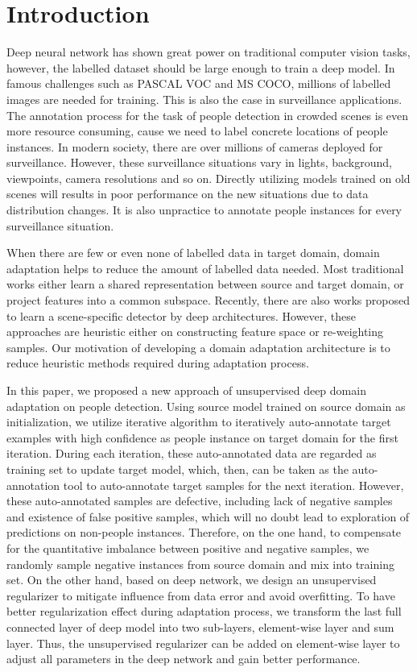 \documentclass[runningheads]{llncs}
\begin{document}
\section{Introduction}

Deep neural network has shown great power on traditional computer vision tasks, however, the labelled dataset should be large enough to train a deep model. In famous challenges such as PASCAL VOC and MS COCO, millions of labelled images are needed for training. This is also the case in surveillance applications. The annotation process for the task of people detection in crowded scenes is even more resource consuming, cause we need to label concrete locations of people instances. In modern society, there are over millions of cameras deployed for surveillance. However, these surveillance situations vary in lights, background, viewpoints, camera resolutions and so on. Directly utilizing models trained on old scenes will results in poor performance on the new situations due to data distribution changes. It is also unpractice to annotate people instances for every surveillance situation.

When there are few or even none of labelled data in target domain, domain adaptation helps to reduce the amount of labelled data needed. Most traditional works \cite{saenko2010adapting,kulis2011you,gopalan2011domain,huang2006correcting,gretton2009covariate} either learn a shared representation between source and target domain, or project features into a common subspace. Recently, there are also works \cite{wang2014scene,zeng2014deep,hattori2015learning} proposed to learn a scene-specific detector by deep architectures. However, these approaches are heuristic either on constructing feature space or re-weighting samples. Our motivation of developing a domain adaptation architecture is to reduce heuristic methods required during adaptation process.

In this paper, we proposed a new approach of unsupervised deep domain adaptation on people detection. Using source model trained on source domain as initialization, we utilize iterative algorithm to iteratively auto-annotate target examples with high confidence as people instance on target domain for the first iteration. During each iteration, these auto-annotated data are regarded as training set to update target model, which, then, can be taken as the auto-annotation tool to auto-annotate target samples for the next iteration. However, these auto-annotated samples are defective, including lack of negative samples and existence of false positive samples, which will no doubt lead to exploration of predictions on non-people instances. Therefore, on the one hand, to compensate for the quantitative imbalance between positive and negative samples, we randomly sample negative instances from source domain and mix into training set. On the other hand, based on deep network, we design an unsupervised regularizer to mitigate influence from data error and avoid overfitting. To have better regularization effect during adaptation process, we transform the last full connected layer of deep model into two sub-layers, element-wise layer and sum layer. Thus, the unsupervised regularizer can be added on element-wise layer to adjust all parameters in the deep network and gain better performance.
\end{document}
